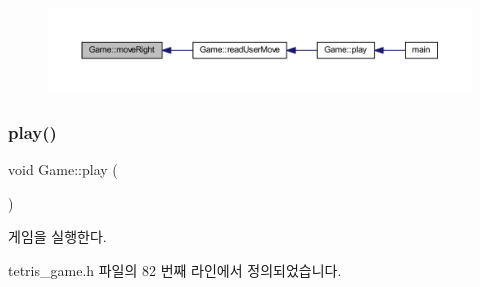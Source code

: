 \nopagebreak
\begin{figure}[H]
\begin{center}
\leavevmode
\includegraphics[width=350pt]{class_game_a36ee055aa2c311deea72c38f50814007_icgraph}
\end{center}
\end{figure}
\mbox{\label{class_game_aa333825d0bca80e91e53c7e23f053405}} 
\subsubsection{\texorpdfstring{play()}{play()}}
{\footnotesize\ttfamily void Game\+::play (\begin{DoxyParamCaption}{ }\end{DoxyParamCaption})\hspace{0.3cm}{\ttfamily [inline]}}



게임을 실행한다. 



tetris\+\_\+game.\+h 파일의 82 번째 라인에서 정의되었습니다.



